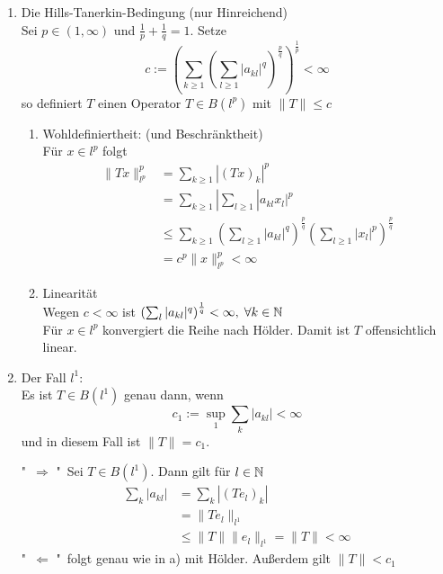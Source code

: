 \begin{beispiel}[Matrizenmultiplikation]
 \begin{enumerate}[label=\alph*\upshape)]
	\item Die Hills-Tanerkin-Bedingung (nur Hinreichend) \\
		Sei $p \in (1, \infty)$ und $\frac{1}{p} + \frac{1}{q} = 1$. Setze
		\[ c := \left( \sum_{k \geq 1} \left( \sum_{l \geq 1} |a_{kl}|^{q} \right)^{\frac{p}{q}} \right)^{\frac{1}{p}} < \infty \]
		so definiert $T$ einen Operator $T \in B(l^{p})$ mit $\| T \| \leq c$ 
		\begin{beweis}
			\begin{enumerate}
				\item Wohldefiniertheit: (und Beschränktheit)  \\
					Für $x \in l^{p}$ folgt
					\begin{align*}
						\| Tx \|_{l^{p}}^{p} &= \sum_{k \geq 1} | (Tx)_{k} |^{p} \\
									 	 &= \sum_{k \geq 1} | \sum_{l \geq 1} |a_{kl} x_{l} |^{p} \\
										 &\leq \sum_{k \geq 1} \left( \sum_{l \geq 1} |a_{kl}|^{q} \right)^{\frac{p}{q}} \left( \sum_{l \geq 1} |x_{l}|^{p} \right)^{\frac{p}{q}} \\
										 &= c^{p} \|x\|_{l^{p}}^{p} < \infty
					\end{align*}
				\item Linearität \\
					Wegen $c < \infty$ ist $\left( \sum_{l} |a_{kl}|^{q} \right)^{\frac{1}{q}} < \infty, \hspace{0.1cm} \forall k \in \mathbb{N}$ \\
					Für $x \in l^{p}$ konvergiert die Reihe nach Hölder. Damit ist $T$ offensichtlich linear.
			\end{enumerate}
		\end{beweis}
	\item Der Fall $l^{1}$: \\
		Es ist $T \in B(l^{1})$ genau dann, wenn 
		\[ c_{1} := \sup_{1} \sum_{k} | a_{kl} | < \infty \]
		und in diesem Fall ist $\| T \| = c_{1}$.
		\begin{beweis}
			"\ $\Rightarrow$ "\  Sei $T \in B(l^{1})$. Dann gilt für $l \in \mathbb{N}$
			\begin{align*}
				\sum_{k} | a_{kl} | &= \sum_{k} |(Te_{l})_{k}| \\
								  	&= \| T e_{l} \|_{l^{1}}  \\
								  	& \leq \| T \| \| e_{l} \|_{l^1} = \| T \| < \infty 
			\end{align*}
			"\ $\Leftarrow$ "\  folgt genau wie in a) mit Hölder. Au{\ss}erdem gilt $\| T \| < c_{1}$			

\end{beweis}
\end{enumerate}
\end{beispiel}
